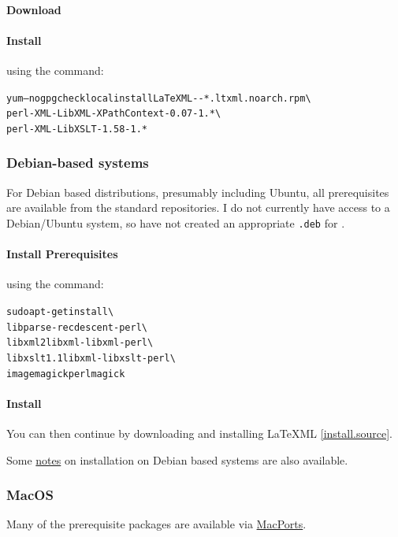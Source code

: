\documentclass{article}
\begin{document}
\paragraph{Download} \CurrentCentos
\paragraph{Install} using the command:
\begin{alltt}
   yum --nogpgcheck localinstall LaTeXML-\CurrentVersion-*.ltxml.noarch.rpm \textbackslash\\
       perl-XML-LibXML-XPathContext-0.07-1.*   \textbackslash\\
       perl-XML-LibXSLT-1.58-1.*
\end{alltt}

\subsubsection{Debian-based systems}\label{install.debian}
For Debian based distributions, presumably including Ubuntu,
all prerequisites are available from the standard repositories.
I do not currently have access to a Debian/Ubuntu system, so
have not created an appropriate \texttt{.deb} for \LaTeXML.
\paragraph{Install Prerequisites} using the command:
\begin{alltt}
   sudo apt-get install   \textbackslash\\
      libparse-recdescent-perl \textbackslash\\
      libxml2 libxml-libxml-perl \textbackslash\\
      libxslt1.1 libxml-libxslt-perl  \textbackslash\\
      imagemagick perlmagick
\end{alltt}
\paragraph{Install}
You can then continue by downloading and installing LaTeXML \ref{install.source}.

Some \href{http://rhaptos.org/devblog/reedstrm/latexml}{notes} on installation on Debian
based systems are also available.

\subsubsection{MacOS}\label{install.macos}
Many of the prerequisite packages are available via
\href{http://www.macports.org}{MacPorts}.
\end{document}
